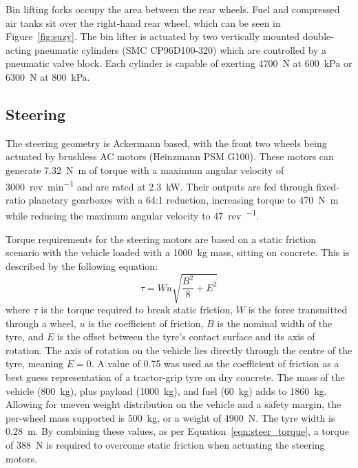 \documentclass[preprint,authoryear,12pt]{elsarticle}
\begin{document}
        Bin lifting forks occupy the area between the rear wheels.
        Fuel and compressed air tanks sit over the right-hand rear wheel, which can be seen in Figure~\ref{fig:suzy}.
        The bin lifter is actuated by two vertically mounted double-acting pneumatic cylinders (SMC CP96D100-320) which are controlled by a pneumatic valve block.
        Each cylinder is capable of exerting \SI{4700}{\newton} at \SI{600}{\kilo\pascal} or \SI{6300}{\newton} at \SI{800}{\kilo\pascal}.


    \subsection{Steering}
    \label{sub:steering}

        The steering geometry is Ackermann based, with the front two wheels being actuated by brushless AC motors (Heinzmann PSM G100).
        These motors can generate \SI{7.32}{\newton\meter} of torque with a maximum angular velocity of \SI{3000}{rev\per\minute} and are rated at \SI{2.3}{\kilo\watt}.
        Their outputs are fed through fixed-ratio planetary gearboxes with a 64:1 reduction, increasing torque to \SI{470}{\newton\meter} while reducing the maximum angular velocity to \SI{47}{rev\per\min}.

        Torque requirements for the steering motors are based on a static friction scenario with the vehicle loaded with a \SI{1000}{\kilo\gram} mass, sitting on concrete.
        This is described by the following equation:
        \begin{equation}
        \label{eqn:steer_torque}
        \tau = W u \sqrt{\frac{B^2}{8} + E^2}
        \end{equation}
        where $\tau$ is the torque required to break static friction, $W$ is the force transmitted through a wheel, $u$ is the coefficient of friction, $B$ is the nominal width of the tyre, and $E$ is the offset between the tyre's contact surface and its axis of rotation.
        The axis of rotation on the vehicle lies directly through the centre of the tyre, meaning $E=0$.
        A value of 0.75 was used as the coefficient of friction as a best guess representation of a tractor-grip tyre on dry concrete.
        The mass of the vehicle (\SI{800}{\kilo\gram}), plus payload (\SI{1000}{\kilo\gram}), and fuel (\SI{60}{\kilo\gram}) adds to \SI{1860}{\kilo\gram}.
        Allowing for uneven weight distribution on the vehicle and a safety margin, the per-wheel mass supported is \SI{500}{\kilo\gram}, or a weight of \SI{4900}{\newton}.
        The tyre width is \SI{0.28}{\meter}.
        By combining these values, as per Equation~\ref{eqn:steer_torque}, a torque of \SI{388}{\newton} is required to overcome static friction when actuating the steering motors.
\end{document}

